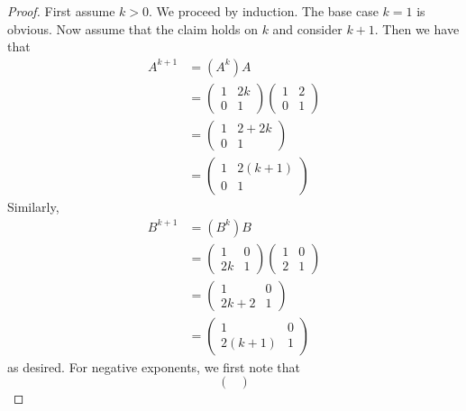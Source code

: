 \begin{proof}
    First assume $k > 0$. We proceed by induction. The base case $k = 1$ is obvious. Now assume that the claim holds on $k$ and consider $k+1$. Then we have that 
    \begin{align*}
        A^{k+1} & = (A^k)A \\
                & = \begin{pmatrix}
                    1 & 2k \\ 0 & 1
                \end{pmatrix}\begin{pmatrix}
                    1 & 2 \\ 0 & 1
                \end{pmatrix} \\
                & = \begin{pmatrix}
                    1 & 2 + 2k \\ 0 & 1
                \end{pmatrix} \\
                & = \begin{pmatrix}
                    1 & 2(k+1) \\ 0 & 1
                \end{pmatrix}
    \end{align*}
    Similarly, 
    \begin{align*}
        B^{k+1} & = (B^k)B \\
                & = \begin{pmatrix}
                    1 & 0 \\ 2k & 1
                \end{pmatrix}\begin{pmatrix}
                    1 & 0 \\ 2 & 1
                \end{pmatrix} \\
                & = \begin{pmatrix}
                    1 & 0 \\ 2k + 2 & 1
                \end{pmatrix} \\
                & = \begin{pmatrix}
                    1 & 0 \\ 2(k+1) & 1
                \end{pmatrix}
    \end{align*}
    as desired. For negative exponents, we first note that
    \[\begin{pmatrix}

\end{pmatrix}\]
\end{proof}
